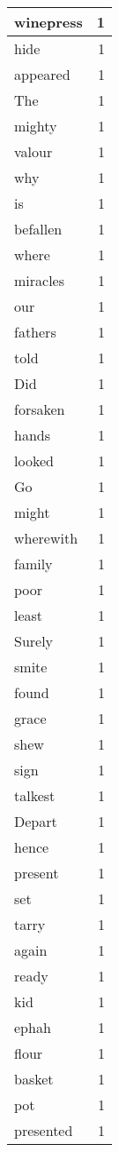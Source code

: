 \begin{center}
\begin{longtable}{l|r}
winepress & 1\\ \hline 
hide & 1\\ \hline 
appeared & 1\\ \hline 
The & 1\\ \hline 
mighty & 1\\ \hline 
valour & 1\\ \hline 
why & 1\\ \hline 
is & 1\\ \hline 
befallen & 1\\ \hline 
where & 1\\ \hline 
miracles & 1\\ \hline 
our & 1\\ \hline 
fathers & 1\\ \hline 
told & 1\\ \hline 
Did & 1\\ \hline 
forsaken & 1\\ \hline 
hands & 1\\ \hline 
looked & 1\\ \hline 
Go & 1\\ \hline 
might & 1\\ \hline 
wherewith & 1\\ \hline 
family & 1\\ \hline 
poor & 1\\ \hline 
least & 1\\ \hline 
Surely & 1\\ \hline 
smite & 1\\ \hline 
found & 1\\ \hline 
grace & 1\\ \hline 
shew & 1\\ \hline 
sign & 1\\ \hline 
talkest & 1\\ \hline 
Depart & 1\\ \hline 
hence & 1\\ \hline 
present & 1\\ \hline 
set & 1\\ \hline 
tarry & 1\\ \hline 
again & 1\\ \hline 
ready & 1\\ \hline 
kid & 1\\ \hline 
ephah & 1\\ \hline 
flour & 1\\ \hline 
basket & 1\\ \hline 
pot & 1\\ \hline 
presented & 1\\ \hline 

\end{longtable}
\end{center}
